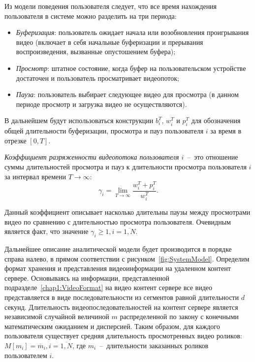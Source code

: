 Из модели поведения пользователя следует, что все время нахождения пользователя в системе можно разделить на три периода:
\begin{itemize}
	\item \textit{Буферизация}: пользователь ожидает начала или возобновления проигрывания видео (включает в себя начальные буферизации и прерывания воспроизведения, вызванные опустошением буфера);
	\item \textit{Просмотр}: штатное состояние, когда буфер на пользовательском устройстве достаточен и пользователь просматривает видеопоток;
	\item \textit{Пауза}: пользователь выбирает следующее видео для просмотра (в данном периоде просмотр и загрузка видео не осуществляются).
\end{itemize}
В дальнейшем будут использоваться конструкции $b_i^T$, $w_i^T$ и $p_i^T$ для обозначения общей длительности буферизации, просмотра и пауз пользователя $i$ за время в отрезке $[0, T]$.

\begin{definition}
\label{def:VideoSparseness}
    \emph{Коэффициент разряженности видеопотока пользователя $i$}~--~это отношение суммы длительностей просмотра и пауз к длительности просмотра пользователя $i$ за интервал времени $T\rightarrow\infty$:
    $$\gamma_i = \lim\limits_{T\rightarrow\infty} \frac{w_i^T + p_i^T}{w_i^T}.$$
\end{definition}
Данный коэффициент описывает насколько длительны паузы между просмотрами видео по сравнению с длительностью просмотра пользователя. Очевидным является факт, что значение $\gamma_i \geq 1, i=\overline{1,N}$.

Дальнейшее описание аналитической модели будет производится в порядке справа налево, в прямом соответствии с рисунком~\ref{fig:SystemModel}. Определим формат хранения и представления видеоинформации на удаленном контент сервере. Основываясь на информации, представленной подразделе~\ref{chap1:VideoFormat} на видео контент сервере все видео представляется в виде последовательности из сегментов равной длительности $d$ секунд. Длительность видеопоследовательностей на контент сервере является независимой случайной величиной $m$ распределенной по закону с конечными математическим ожиданием и дисперсией. Таким образом, для каждого пользователя существует средняя длительность просмотренных видео роликов: $M[m_i] = \overline{m}_i, i=\overline{1,N}$, где $m_i$~--~длительности заказанных роликов пользователем $i$.

